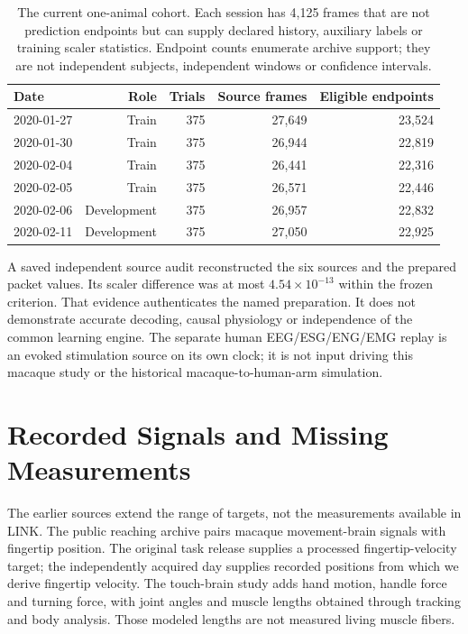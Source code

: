 \begin{table}[t]
\centering\small
\begin{tabular}{lrrrr}
\toprule Date & Role & Trials & Source frames & Eligible endpoints\\\midrule
2020-01-27 & Train &375&27,649&23,524\\
2020-01-30 & Train &375&26,944&22,819\\
2020-02-04 & Train &375&26,441&22,316\\
2020-02-05 & Train &375&26,571&22,446\\
2020-02-06 & Development &375&26,957&22,832\\
2020-02-11 & Development &375&27,050&22,925\\\bottomrule
\end{tabular}
\caption{The current one-animal cohort. Each session has 4,125 frames that are
not prediction endpoints but can supply declared history, auxiliary labels or
training scaler statistics. Endpoint counts enumerate archive support; they
are not independent subjects, independent windows or confidence intervals.}
\end{table}

A saved independent source audit reconstructed the six sources and the prepared
packet values. Its scaler difference was at most $4.54\times10^{-13}$ within the
frozen criterion. That evidence authenticates the named preparation. It does
not demonstrate accurate decoding, causal physiology or independence of the
common learning engine. The separate human EEG/\allowbreak{}ESG/\allowbreak{}ENG/\allowbreak{}EMG replay is an evoked
stimulation source on its own clock; it is not input driving this macaque study
or the historical macaque-to-human-arm simulation.


\section{Recorded Signals and Missing Measurements}

The earlier sources extend the range of targets, not the measurements available in LINK. The public reaching archive pairs macaque movement-brain signals with fingertip
position. The original task release supplies a processed fingertip-velocity target;
the independently acquired day supplies recorded positions from which we
derive fingertip velocity. The touch-brain study adds hand motion, handle force and turning
force, with joint angles and muscle lengths obtained through tracking and body
analysis. Those modeled lengths are not measured living muscle fibers.
\citep{odoherty2020,chowdhury2020,nlb2021,falcon2024}

